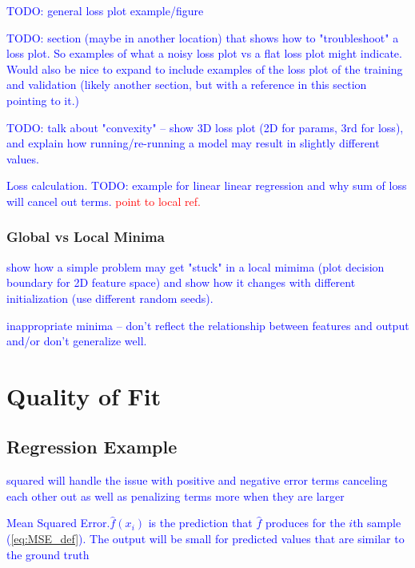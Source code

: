 \textcolor{blue}{TODO: general loss plot example/figure}

\textcolor{blue}{TODO: section (maybe in another location) that shows how to "troubleshoot" a loss plot. So examples of what a noisy loss plot vs a flat loss plot might indicate. Would also be nice to expand to include examples of the loss plot of the training and validation (likely another section, but with a reference in this section pointing to it.)}

\textcolor{blue}{TODO: talk about "convexity" -- show 3D loss plot (2D for params, 3rd for loss), and explain how running/re-running a model may result in slightly different values.}

\textcolor{blue}{Loss calculation. TODO: example for linear linear regression and why sum of loss will cancel out terms. \textcolor{red}{point to local ref.}}

\subsubsection{Global vs Local Minima}

\textcolor{blue}{show how a simple problem may get "stuck" in a local mimima (plot decision boundary for 2D feature space) and show how it changes with different initialization (use different random seeds). }

\textcolor{blue}{{inappropriate minima} -- don't reflect the relationship between features and output and/or don't generalize well.}

\section{Quality of Fit}


\subsection{Regression Example}


\textcolor{blue}{squared will handle the issue with positive and negative error terms canceling each other out as well as penalizing terms more when they are larger}

\textcolor{blue}{Mean Squared Error.$\hat{f}(x_i)$ is the prediction that $\hat{f}$ produces for the $i$th sample (\ref{eq:MSE_def}). The output will be small for predicted values that are similar to the ground truth}

